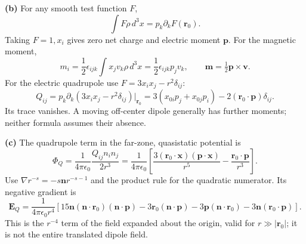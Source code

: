 \textbf{(b)} For any smooth test function $F$,
\[
\int F\rho\,d^3x=p_k\partial_kF(\mathbf r_0).
\]
Taking $F=1,x_i$ gives zero net charge and electric moment $\mathbf p$.
For the magnetic moment,
\[
 m_i=\frac12\epsilon_{ijk}\int x_jv_k\rho\,d^3x
=\frac12\epsilon_{ijk}p_jv_k,\qquad
\boxed{\mathbf m=\tfrac12\mathbf p\times\mathbf v}.
\]
For the electric quadrupole use $F=3x_ix_j-r^2\delta_{ij}$:
\[
\boxed{Q_{ij}=p_k\partial_k(3x_ix_j-r^2\delta_{ij})\big|_{\mathbf r_0}
=3(x_{0i}p_j+x_{0j}p_i)-2(\mathbf r_0\cdot\mathbf p)\delta_{ij}}.
\]
Its trace vanishes. A moving off-center dipole generally has further
moments; neither formula assumes their absence.

\textbf{(c)} The quadrupole term in the far-zone, quasistatic potential is
\[
\Phi_Q=\frac1{4\pi\epsilon_0}\frac{Q_{ij}n_in_j}{2r^3}
=\frac1{4\pi\epsilon_0}\left[
\frac{3(\mathbf r_0\cdot\mathbf x)(\mathbf p\cdot\mathbf x)}{r^5}
-\frac{\mathbf r_0\cdot\mathbf p}{r^3}\right].
\]
Use $\nabla r^{-s}=-s\mathbf n r^{-s-1}$ and the product rule for the
quadratic numerator. Its negative gradient is
\[
\boxed{\mathbf E_Q=\frac1{4\pi\epsilon_0r^4}
\left[15\mathbf n(\mathbf n\cdot\mathbf r_0)(\mathbf n\cdot\mathbf p)
-3\mathbf r_0(\mathbf n\cdot\mathbf p)-3\mathbf p(\mathbf n\cdot\mathbf r_0)
-3\mathbf n(\mathbf r_0\cdot\mathbf p)\right].}
\]
This is the $r^{-4}$ term of the field expanded about the origin,
valid for $r\gg|\mathbf r_0|$; it is not the entire translated dipole field.

